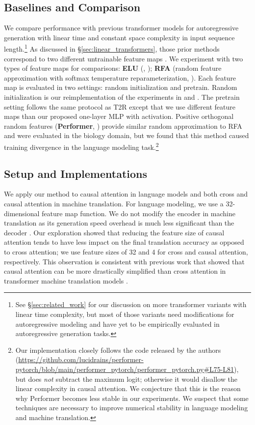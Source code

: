 \documentclass[11pt]{article}
\newcommand{\TRNN}{T2R\xspace}
\begin{document}
\subsection{Baselines and Comparison}
We compare performance with previous transformer models for autoregressive generation with linear time and constant space complexity in input sequence length.\footnote{See \S\ref{sec:related_work} for our discussion on more transformer variants with linear time complexity, but most of those variants need modifications for autoregressive modeling and have yet to be empirically evaluated in autoregressive generation tasks.} 
As discussed in \S\ref{sec:linear_transformers}, those prior methods correspond to two different untrainable feature maps .
We experiment with two types of feature maps for comparisons: \textbf{ELU} (, \citealp{katharopoulos-et-al-2020}); \textbf{RFA} (random feature approximation with softmax temperature reparameterization, \citealp{RFA}).
Each feature map is evaluated in two settings: random initialization and pretrain.
Random initialization is our reimplementation of the experiments in \citet{katharopoulos-et-al-2020} and \citet{RFA}.
The pretrain setting follows the same protocol as \TRNN except that we use different feature maps  than our proposed one-layer MLP with  activation.
Positive orthogonal random features (\textbf{Performer}, \citealp{performer}) provide similar random approximation to RFA and were evaluated in the biology domain, but we found that this method caused training divergence in the language modeling task.\footnote{Our implementation closely follows the code released by the authors (\url{https://github.com/lucidrains/performer-pytorch/blob/main/performer_pytorch/performer_pytorch.py\#L75-L81}), but does \textit{not} subtract the maximum logit; otherwise it would disallow the linear complexity in causal attention. We conjecture that this is the reason why Performer becomes less stable in our experiments. We suspect that some techniques are necessary to improve numerical stability in language modeling and machine translation.
}


 


\subsection{Setup and Implementations}
We apply our method to causal attention in language models and both cross and causal attention in machine translation.
For language modeling, we use a 32-dimensional feature map function.
We do not modify the encoder in machine translation as its generation speed overhead is much less significant than the decoder \cite{deepshallow}.
Our exploration showed that reducing the feature size of causal attention tends to have less impact on the final translation accuracy as opposed to cross attention; we use feature sizes of 32 and 4 for cross and causal attention, respectively. 
This observation is consistent with previous work that showed that causal attention can be more drastically simplified than cross attention in transformer machine translation models \cite{you-etal-2020-hard, synthesizer}.
\end{document}
